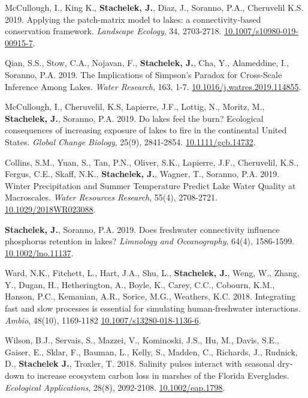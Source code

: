 \documentclass[11pt]{article}
\makeatletter
\newlength{\bibhang}
\newlength{\bibsep}
 {\@listi \global\bibsep\itemsep \global\advance\bibsep by\parsep}
\newenvironment{bibenum*}
  {\renewcommand\labelenumi{[\theenumi]}%
   \etaremune[
     topsep=0pt,
     itemsep=\bibsep,
     parsep=0pt,partopsep=0pt,
     itemindent=-\bibhang,
     leftmargin={\bibhang+\widthof{[999]}}]}
  {\endetaremune}
\makeatother
\begin{document}
\begin{bibenum*}
\item McCullough, I., King K., \textbf{Stachelek, J.}, Diaz, J., Soranno, P.A., Cheruvelil K.S. 2019. Applying the patch-matrix model to lakes: a connectivity-based conservation framework. \emph{Landscape Ecology}, 34, 2703-2718. \href{https://doi.org/10.1007/s10980-019-00915-7}{10.1007/s10980-019-00915-7}.

\item Qian, S.S., Stow, C.A., Nojavan, F., \textbf{Stachelek, J.}, Cha, Y., Alameddine, I., Soranno, P.A. 2019. The Implications of Simpson's Paradox for Cross-Scale Inference Among Lakes. \emph{Water Research}, 163, 1-7. \href{https://doi.org/10.1016/j.watres.2019.114855}{10.1016/j.watres.2019.114855}.

\item McCullough, I., Cheruvelil, K.S, Lapierre, J.F., Lottig, N., Moritz, M., \textbf{Stachelek, J.}, Soranno, P.A. 2019. Do lakes feel the burn? Ecological consequences of increasing exposure of lakes to fire in the continental United States. \emph{Global Change Biology}, 25(9), 2841-2854. \href{https://doi.org/10.1111/gcb.14732}{10.1111/gcb.14732}.

\item Collins, S.M., Yuan, S., Tan, P.N., Oliver, S.K., Lapierre, J.F., Cheruvelil, K.S., Fergus, C.E., Skaff, N.K., \textbf{Stachelek, J.}, Wagner, T., Soranno, P.A. 2019. Winter Precipitation and Summer Temperature Predict Lake Water Quality at Macroscales. \emph{Water Resources Research}, 55(4), 2708-2721. \href{https://doi.org/10.1029/2018WR023088}{10.1029/2018WR023088}.

\item \textbf{Stachelek, J.}, Soranno, P.A. 2019. Does freshwater connectivity influence phosphorus retention in lakes? \emph{Limnology and Oceanography}, 64(4), 1586-1599. \href{https://doi.org/10.1002/lno.11137}{10.1002/lno.11137}.

\item Ward, N.K., Fitchett, L., Hart, J.A., Shu, L., \textbf{Stachelek, J.}, Weng, W., Zhang, Y., Dugan, H., Hetherington, A., Boyle, K., Carey, C.C., Cobourn, K.M., Hanson, P.C., Kemanian, A.R., Sorice, M.G., Weathers, K.C. 2018. Integrating fast and slow processes is essential for simulating human-freshwater interactions. \emph{Ambio}, 48(10), 1169-1182 \href{https://doi.org/10.1007/s13280-018-1136-6}{10.1007/s13280-018-1136-6}.

\item Wilson, B.J., Servais, S., Mazzei, V., Kominoski, J.S., Hu, M., Davis, S.E., Gaiser, E., Sklar, F., Bauman, L., Kelly, S., Madden, C., Richards, J., Rudnick, D., \textbf{Stachelek J.}, Troxler, T. 2018. Salinity pulses interact with seasonal dry‐down to increase ecosystem carbon loss in marshes of the Florida Everglades. \emph{Ecological Applications}, 28(8), 2092-2108. \href{https://doi.org/10.1002/eap.1798}{10.1002/eap.1798}.


\end{bibenum*}
\end{document}
